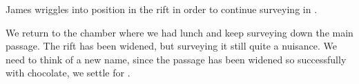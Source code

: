\begin{marginfigure}
\checkoddpage \ifoddpage \forcerectofloat \else \forceversofloat \fi
\centering
 \caption{James wriggles into position in the rift in order to continue surveying in . } \label{M2 survey 1}
\end{marginfigure}

We return to the chamber where we had lunch and keep surveying down the
main passage. The rift has been widened, but surveying it still quite a
nuisance. We need to think of a new name, since the passage has been
widened so successfully with chocolate, we settle for .

